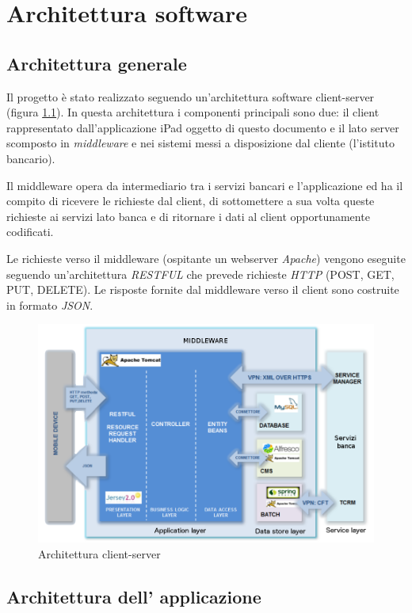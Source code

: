\chapter{Architettura software}


\section{Architettura generale}

Il progetto è stato realizzato seguendo un'architettura software client-server (figura \ref{fig:arch}). In questa architettura i componenti principali sono due: il client rappresentato dall'applicazione iPad oggetto di questo documento e il lato server scomposto in \emph{middleware} e nei sistemi messi a disposizione dal cliente (l'istituto bancario).

Il middleware opera da intermediario tra i servizi bancari e l'applicazione ed  ha il compito di ricevere le richieste dal client, di sottomettere a sua volta queste richieste ai servizi lato banca e di ritornare i dati al client opportunamente codificati.

Le richieste verso il middleware (ospitante un webserver \emph{Apache}) vengono eseguite seguendo un'architettura \emph{RESTFUL}  che prevede richieste \emph{HTTP} (POST, GET, PUT, DELETE). Le risposte fornite dal middleware verso il client sono costruite in formato \emph{JSON}.


\begin{figure}[!htbp]
\centering
\includegraphics[scale=0.60]{architettura/architect.png}
\caption{Architettura client-server}
\label{fig:arch}
\end{figure}

\section{Architettura dell' applicazione}


